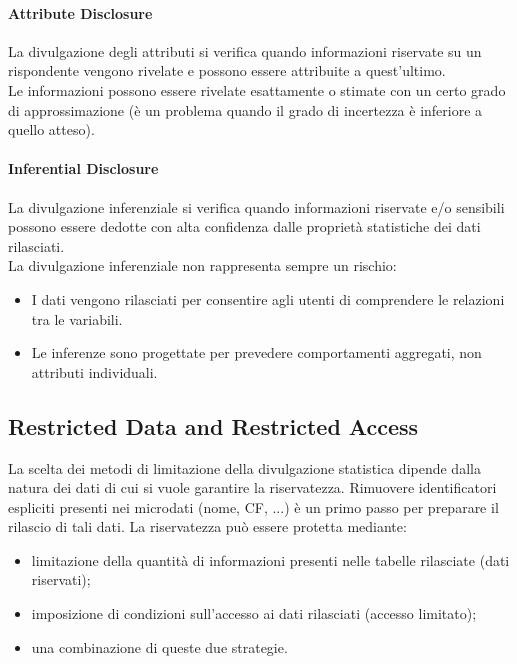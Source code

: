 \documentclass{report}
\begin{document}
\paragraph{Attribute Disclosure}
La divulgazione degli attributi si verifica quando informazioni riservate su un rispondente vengono rivelate e possono essere attribuite a quest'ultimo. \\ 
Le informazioni possono essere rivelate esattamente o stimate con un certo grado di approssimazione (è un problema quando il grado di incertezza è inferiore a quello atteso).

\paragraph{Inferential Disclosure}
La divulgazione inferenziale si verifica quando informazioni riservate e/o sensibili possono essere dedotte con alta confidenza dalle proprietà statistiche dei dati rilasciati. \\
La divulgazione inferenziale non rappresenta sempre un rischio:
\begin{itemize}
    \item I dati vengono rilasciati per consentire agli utenti di comprendere le relazioni tra le variabili.
    \item Le inferenze sono progettate per prevedere comportamenti aggregati, non attributi individuali.
\end{itemize}

\subsection{Restricted Data and Restricted Access}
La scelta dei metodi di limitazione della divulgazione statistica dipende dalla natura dei dati di cui si vuole garantire la riservatezza. 
Rimuovere identificatori espliciti presenti nei microdati (nome, CF, ...) è un primo passo per preparare il rilascio di tali dati. La riservatezza può essere protetta mediante:
\begin{itemize}
    \item limitazione della quantità di informazioni presenti nelle tabelle rilasciate (dati riservati);
    \item imposizione di condizioni sull'accesso ai dati rilasciati (accesso limitato);
    \item una combinazione di queste due strategie.
\end{itemize}
\end{document}
